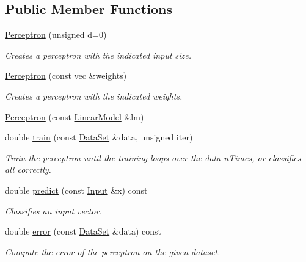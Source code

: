 \subsection*{Public Member Functions}
\begin{DoxyCompactItemize}
\item 
\hyperlink{classhappyml_1_1Perceptron_afda225f54fc7810f431310380ad67934}{Perceptron} (unsigned d=0)
\begin{DoxyCompactList}\small\item\em Creates a perceptron with the indicated input size. \end{DoxyCompactList}\item 
\hyperlink{classhappyml_1_1Perceptron_a087a141d78442d353165ba8de91061a0}{Perceptron} (const vec \&weights)
\begin{DoxyCompactList}\small\item\em Creates a perceptron with the indicated weights. \end{DoxyCompactList}\item 
\hyperlink{classhappyml_1_1Perceptron_a15bca77ab91b58708d6d7506fbf5af96}{Perceptron} (const \hyperlink{classhappyml_1_1LinearModel}{Linear\+Model} \&lm)
\item 
double \hyperlink{classhappyml_1_1Perceptron_aa5b2a16fa72ef8575c8d4778b993fedd}{train} (const \hyperlink{classhappyml_1_1DataSet}{Data\+Set} \&data, unsigned iter)
\begin{DoxyCompactList}\small\item\em Train the perceptron until the training loops over the data n\+Times, or classifies all correctly. \end{DoxyCompactList}\item 
double \hyperlink{classhappyml_1_1Perceptron_aaa3c4d2a5235d6b5498de77f926c15f3}{predict} (const \hyperlink{namespacehappyml_a03602d1ec49393790b8a0449f40cd01f}{Input} \&x) const 
\begin{DoxyCompactList}\small\item\em Classifies an input vector. \end{DoxyCompactList}\item 
double \hyperlink{classhappyml_1_1Perceptron_aff79f084e1f9261e4e10feda0a5e74dd}{error} (const \hyperlink{classhappyml_1_1DataSet}{Data\+Set} \&data) const 
\begin{DoxyCompactList}\small\item\em Compute the error of the perceptron on the given dataset. \end{DoxyCompactList}\end{DoxyCompactItemize}
